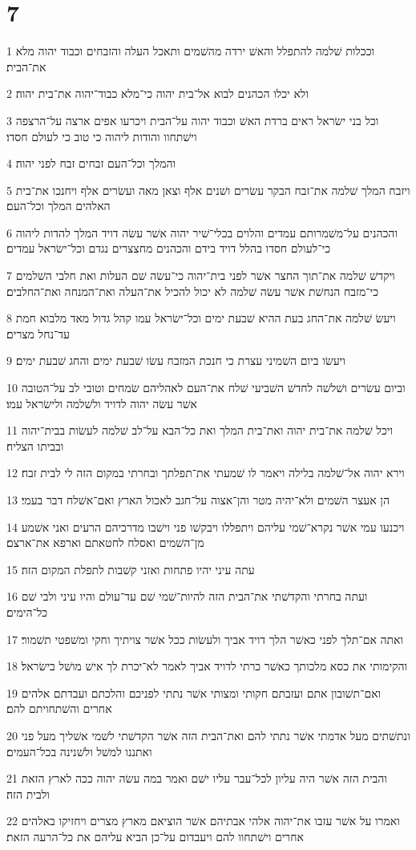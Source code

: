 \chapter{7}

\par 1 וככלות שׁלמה להתפלל והאשׁ ירדה מהשׁמים ותאכל העלה והזבחים וכבוד יהוה מלא את־הבית׃
\par 2 ולא יכלו הכהנים לבוא אל־בית יהוה כי־מלא כבוד־יהוה את־בית יהוה׃
\par 3 וכל בני ישׂראל ראים ברדת האשׁ וכבוד יהוה על־הבית ויכרעו אפים ארצה על־הרצפה וישׁתחוו והודות ליהוה כי טוב כי לעולם חסדו׃
\par 4 והמלך וכל־העם זבחים זבח לפני יהוה׃
\par 5 ויזבח המלך שׁלמה את־זבח הבקר עשׂרים ושׁנים אלף וצאן מאה ועשׂרים אלף ויחנכו את־בית האלהים המלך וכל־העם׃
\par 6 והכהנים על־משׁמרותם עמדים והלוים בכלי־שׁיר יהוה אשׁר עשׂה דויד המלך להדות ליהוה כי־לעולם חסדו בהלל דויד בידם והכהנים מחצצרים נגדם וכל־ישׂראל עמדים׃
\par 7 ויקדשׁ שׁלמה את־תוך החצר אשׁר לפני בית־יהוה כי־עשׂה שׁם העלות ואת חלבי השׁלמים כי־מזבח הנחשׁת אשׁר עשׂה שׁלמה לא יכול להכיל את־העלה ואת־המנחה ואת־החלבים׃
\par 8 ויעשׂ שׁלמה את־החג בעת ההיא שׁבעת ימים וכל־ישׂראל עמו קהל גדול מאד מלבוא חמת עד־נחל מצרים׃
\par 9 ויעשׂו ביום השׁמיני עצרת כי חנכת המזבח עשׂו שׁבעת ימים והחג שׁבעת ימים׃
\par 10 וביום עשׂרים ושׁלשׁה לחדשׁ השׁביעי שׁלח את־העם לאהליהם שׂמחים וטובי לב על־הטובה אשׁר עשׂה יהוה לדויד ולשׁלמה ולישׂראל עמו׃
\par 11 ויכל שׁלמה את־בית יהוה ואת־בית המלך ואת כל־הבא על־לב שׁלמה לעשׂות בבית־יהוה ובביתו הצליח׃
\par 12 וירא יהוה אל־שׁלמה בלילה ויאמר לו שׁמעתי את־תפלתך ובחרתי במקום הזה לי לבית זבח׃
\par 13 הן אעצר השׁמים ולא־יהיה מטר והן־אצוה על־חגב לאכול הארץ ואם־אשׁלח דבר בעמי׃
\par 14 ויכנעו עמי אשׁר נקרא־שׁמי עליהם ויתפללו ויבקשׁו פני וישׁבו מדרכיהם הרעים ואני אשׁמע מן־השׁמים ואסלח לחטאתם וארפא את־ארצם׃
\par 15 עתה עיני יהיו פתחות ואזני קשׁבות לתפלת המקום הזה׃
\par 16 ועתה בחרתי והקדשׁתי את־הבית הזה להיות־שׁמי שׁם עד־עולם והיו עיני ולבי שׁם כל־הימים׃
\par 17 ואתה אם־תלך לפני כאשׁר הלך דויד אביך ולעשׂות ככל אשׁר צויתיך וחקי ומשׁפטי תשׁמור׃
\par 18 והקימותי את כסא מלכותך כאשׁר כרתי לדויד אביך לאמר לא־יכרת לך אישׁ מושׁל בישׂראל׃
\par 19 ואם־תשׁובון אתם ועזבתם חקותי ומצותי אשׁר נתתי לפניכם והלכתם ועבדתם אלהים אחרים והשׁתחויתם להם׃
\par 20 ונתשׁתים מעל אדמתי אשׁר נתתי להם ואת־הבית הזה אשׁר הקדשׁתי לשׁמי אשׁליך מעל פני ואתננו למשׁל ולשׁנינה בכל־העמים׃
\par 21 והבית הזה אשׁר היה עליון לכל־עבר עליו ישׁם ואמר במה עשׂה יהוה ככה לארץ הזאת ולבית הזה׃
\par 22 ואמרו על אשׁר עזבו את־יהוה אלהי אבתיהם אשׁר הוציאם מארץ מצרים ויחזיקו באלהים אחרים וישׁתחוו להם ויעבדום על־כן הביא עליהם את כל־הרעה הזאת׃

